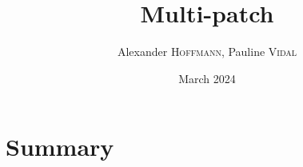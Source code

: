 \documentclass[10pt,a4paper]{article}
\title{Multi-patch}
\author{Alexander \textsc{Hoffmann}, Pauline \textsc{Vidal}}
\date{March 2024}
\begin{document}
\maketitle


\tableofcontents

\newpage


\section{Summary}



\end{document}
